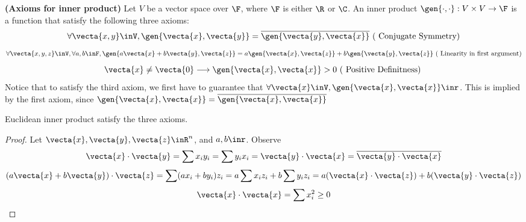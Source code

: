 \documentclass{report}
\begin{document}
\begin{axiom}
\label{1.6.6}
\textbf{(Axioms for inner product)} Let $V$ be a vector space over $\F$, where $\F$ is either $\R$ or $\C$. An inner product $\gen{\cdot,\cdot}:V\times V\rightarrow \F $ is a function that satisfy the following three axioms: 
\begin{equation*}
\forall \vecta{x,y}\inV,\gen{\vecta{x},\vecta{y}}=\overline{\gen{\vecta{y},\vecta{x}}}\text{ ( Conjugate Symmetry)}
\end{equation*}
\begin{equation*}
\forall \vecta{x,y,z}\inV, \forall a,b\inF, \gen{a\vecta{x}+b\vecta{y},\vecta{z}}=a\gen{\vecta{x},\vecta{z}}+b\gen{\vecta{y},\vecta{z}} \text{ ( Linearity in first argument)} 
\end{equation*}
\begin{equation*}
\vecta{x}\neq \vecta{0}\longrightarrow \gen{\vecta{x},\vecta{x}}>0 \text{ ( Positive Definitness) }  
\end{equation*}
Notice that to satisfy the third axiom, we first have to guarantee that $\forall \vecta{x}\inV,\gen{\vecta{x},\vecta{x}}\inr$. This is implied by the first axiom, since $\gen{\vecta{x},\vecta{x}}=\overline{\gen{\vecta{x},\vecta{x}}}$ 
\end{axiom}
\begin{theorem}
\label{1.6.7}
Euclidean inner product satisfy the three axioms. 
\end{theorem}
\begin{proof}
Let $\vecta{x},\vecta{y},\vecta{z}\inR^n$, and $a,b\inr$. Observe
\begin{equation*}
\vecta{x}\cdot\vecta{y}=\sum x_iy_i=\sum y_ix_i=\vecta{y}\cdot\vecta{x}=\overline{\vecta{y}\cdot\vecta{x}}
\end{equation*}
\begin{equation*}
  (a\vecta{x}+b\vecta{y})\cdot\vecta{z}=\sum (ax_i+by_i)z_i=a\sum x_iz_i + b\sum y_iz_i=a(\vecta{x}\cdot\vecta{z})+b(\vecta{y}\cdot\vecta{z})
\end{equation*}
\begin{equation*}
\vecta{x}\cdot\vecta{x}=\sum x_i^2\geq 0
\end{equation*}
\end{proof}
\end{document}
